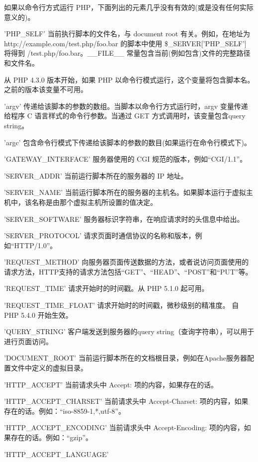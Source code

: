 如果以命令行方式运行 PHP，下面列出的元素几乎没有有效的(或是没有任何实际意义的)。

\begin{compactitem}
\item 'PHP\_SELF'
当前执行脚本的文件名，与 document root 有关。例如，在地址为 http://example.com/test.php/foo.bar 的脚本中使用 \$\_SERVER['PHP\_SELF'] 将得到 /test.php/foo.bar。\_\_FILE\_\_ 常量包含当前(例如包含)文件的完整路径和文件名。 

从 PHP 4.3.0 版本开始，如果 PHP 以命令行模式运行，这个变量将包含脚本名。之前的版本该变量不可用。
\item 'argv'
传递给该脚本的参数的数组。当脚本以命令行方式运行时，argv 变量传递给程序 C 语言样式的命令行参数。当通过 GET 方式调用时，该变量包含query string。
\item 'argc'
包含命令行模式下传递给该脚本的参数的数目(如果运行在命令行模式下)。
\item 'GATEWAY\_INTERFACE'
服务器使用的 CGI 规范的版本，例如“CGI/1.1”。
\item 'SERVER\_ADDR'
当前运行脚本所在的服务器的 IP 地址。
\item 'SERVER\_NAME'
当前运行脚本所在的服务器的主机名。如果脚本运行于虚拟主机中，该名称是由那个虚拟主机所设置的值决定。
\item 'SERVER\_SOFTWARE'
服务器标识字符串，在响应请求时的头信息中给出。
\item 'SERVER\_PROTOCOL'
请求页面时通信协议的名称和版本，例如“HTTP/1.0”。
\item 'REQUEST\_METHOD'
向服务器页面传送数据的方法，或者说访问页面使用的请求方法，HTTP支持的请求方法包括“GET”、“HEAD”、“POST”和“PUT”等。
\item 'REQUEST\_TIME'
请求开始时的时间戳。从 PHP 5.1.0 起可用。
\item 'REQUEST\_TIME\_FLOAT'
请求开始时的时间戳，微秒级别的精准度。 自 PHP 5.4.0 开始生效。
\item 'QUERY\_STRING'
客户端发送到服务器的query string（查询字符串），可以用于进行页面访问。
\item 'DOCUMENT\_ROOT'
当前运行脚本所在的文档根目录，例如在Apache服务器配置文件中定义的虚拟目录。
\item 'HTTP\_ACCEPT'
当前请求头中 Accept: 项的内容，如果存在的话。
\item 'HTTP\_ACCEPT\_CHARSET'
当前请求头中 Accept-Charset: 项的内容，如果存在的话。例如：“iso-8859-1,*,utf-8”。
\item 'HTTP\_ACCEPT\_ENCODING'
当前请求头中 Accept-Encoding: 项的内容，如果存在的话。例如：“gzip”。
\item 'HTTP\_ACCEPT\_LANGUAGE'

\end{compactitem}
